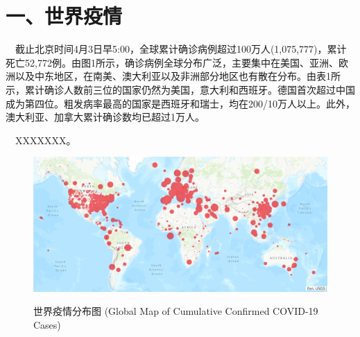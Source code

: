 \documentclass[
]{article}
\begin{document}
\hypertarget{section-2}{%
\section{\texorpdfstring{\textcolor{glaucous}{一、世界疫情}}{}}\label{section-2}}

~~截止北京时间4月3日早5:00，全球累计确诊病例超过100万人(1,075,777)，累计死亡52,772例。由图1所示，确诊病例全球分布广泛，主要集中在美国、亚洲、欧洲以及中东地区，在南美、澳大利亚以及非洲部分地区也有散在分布。由表1所示，累计确诊人数前三位的国家仍然为美国，意大利和西班牙。德国首次超过中国成为第四位。粗发病率最高的国家是西班牙和瑞士，均在200/10万人以上。此外，澳大利亚、加拿大累计确诊数均已超过1万人。

~~XXXXXXX。

\begin{figure}[H]
\caption{世界疫情分布图 (Global Map of Cumulative Confirmed COVID-19 Cases)} %
\centering
\includegraphics[]{./input/covid1.png} %
\label{} %
\end{figure}
\end{document}
